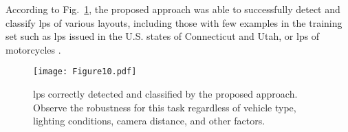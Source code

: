 According to Fig.~\ref{fig:results:lp_detection_tps}, the proposed approach was able to successfully detect and classify \glspl*{lp} of various layouts, including those with few examples in the training set such as \glspl*{lp} issued in the U.S. states of Connecticut and Utah, or \glspl*{lp} of motorcycles .


\begin{figure}[!htb]
    \centering
    
    \texttt{[image: Figure10.pdf]}
    
    \vspace{-2mm}
    
    \caption[\glspl*{lp} correctly detected and classified by the proposed approach]{\glspl*{lp} correctly detected and classified by the proposed approach. Observe the robustness for this task regardless of vehicle type, lighting conditions, camera distance, and other factors.}
    \label{fig:results:lp_detection_tps}
    
\end{figure}


